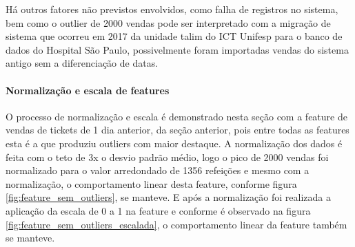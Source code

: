 \documentclass[	12pt, Times, openright, twoside, a4paper, english, brazil]{abntex2}
\begin{document}
        	        Há outros fatores não previstos envolvidos, como falha de registros no sistema, bem como o outlier de 2000 vendas pode ser interpretado com a migração de sistema que ocorreu em 2017 da unidade talim do ICT Unifesp para o banco de dados do Hospital São Paulo, possivelmente foram importadas vendas do sistema antigo sem a diferenciação de datas.

                \paragraph*{Normalização e escala de features}
                    O processo de normalização e escala é demonstrado nesta seção com a feature de vendas de tickets de 1 dia anterior, da seção anterior, pois entre todas as features esta é a que produziu outliers com maior destaque.
                    A normalização dos dados é feita com o teto de 3x o desvio padrão médio, logo o pico de 2000 vendas foi normalizado para o valor arredondado de 1356 refeições e mesmo com a normalização, o comportamento linear desta feature, conforme figura \ref{fig:feature_sem_outliers}, se manteve.   
                    E após a normalização foi realizada a aplicação da escala de 0 a 1 na feature e conforme é observado na figura  \ref{fig:feature_sem_outliers_escalada}, o comportamento linear da feature também se manteve.
\end{document}
